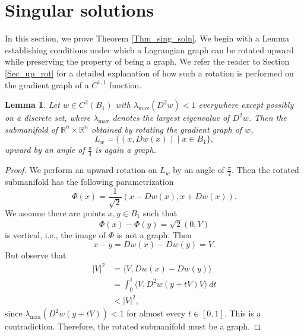 \documentclass[12pt,reqno]{amsart}%
\theoremstyle{plain}
\newtheorem{lemma}[theorem]{Lemma}
\numberwithin{equation}{section}
\theoremstyle{definition}
\theoremstyle{remark}
\newcommand{\R}{\mathbb{R}}
\begin{document}
\section{Singular solutions}\label{Sec_singsoln}


In this section, we prove Theorem \ref{Thm_sing_soln}. We begin with a Lemma establishing conditions under which a Lagrangian graph can be rotated upward while preserving the property of being a graph. We refer the reader to Section \ref{Sec_up_rot} for a detailed explanation of how such a rotation is performed on the gradient graph of a $C^{1,1}$ function. 

\begin{lemma}\label{rotatedgraph}
Let $w \in C^2(B_1)$ with $\lambda_{\max}(D^2 w) < 1$ everywhere except possibly on a discrete set, where $\lambda_{\max}$ denotes the largest eigenvalue of $D^2 w$. Then the submanifold of $\R^n \times \R^n$ obtained by rotating the gradient graph of $w$,
\[
L_w = \{ (x, Dw(x)) \;|\; x \in B_1 \},
\]
upward by an angle of $\tfrac{\pi}{4}$ is again a graph.
\end{lemma}


\begin{proof} We perform an upward rotation on $L_w$ by an angle of $\frac{\pi}{4}$. Then the rotated submanifold  has the following parametrization 
$$ \Phi ( x ) = \frac 1 {\sqrt 2} ( x - Dw(x) , x + Dw(x)).$$ 
We assume there are points $x, y \in B_1$ such that 
$$ \Phi (x) - \Phi (y)  = \sqrt  2(0,V)$$
is vertical, i.e., the image of $\Phi$ is not a graph. Then $$x-y = Dw(x)-Dw(y) = V.$$
But observe that
\begin{align*} 
\vert V\vert^2 & = \langle V, Dw(x) - Dw(y) \rangle \\
& = \int _0^1 \langle V, D^2 w ( y + t V ) V \rangle \: dt \\
& < \vert V\vert ^2 ,
\end{align*}
since $\lambda_{\max} ( D^2 w ( y + t V ) ) < 1 $ for almost every $t \in [0,1].$
This is a contradiction. Therefore, the rotated submanifold must be a graph. 
\end{proof} 
\end{document}
